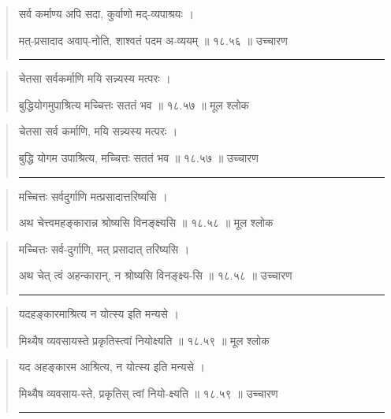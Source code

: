 \begin{quotation}

सर्व कर्माण्य अपि सदा, कुर्वाणो मद्-व्यपाश्रयः ।  

मत्-प्रसादाद अवाप्-नोति, शाश्वतं पदम अ-व्ययम्‌  ॥ १८.५६ ॥  उच्चारण

\noindent\rule{16cm}{0.4pt} 
\end{quotation}


\begin{quotation}

चेतसा सर्वकर्माणि मयि सन्न्यस्य मत्परः ।  

बुद्धियोगमुपाश्रित्य मच्चित्तः सततं भव  ॥ १८.५७ ॥  मूल श्लोक
\end{quotation}

\begin{quotation}

चेतसा सर्व कर्माणि, मयि सन्न्यस्य मत्परः ।  

बुद्धि योगम उपाश्रित्य, मच्चित्तः सततं भव  ॥ १८.५७ ॥  उच्चारण

\noindent\rule{16cm}{0.4pt} 
\end{quotation}


\begin{quotation}

मच्चित्तः सर्वदुर्गाणि मत्प्रसादात्तरिष्यसि ।  

अथ चेत्त्वमहङ्कारान्न श्रोष्यसि विनङ्क्ष्यसि  ॥ १८.५८ ॥  मूल श्लोक
\end{quotation}

\begin{quotation}

मच्चित्तः सर्व-दुर्गाणि, मत् प्रसादात् तरिष्यसि ।  

अथ चेत् त्वं अहन्कारान्, न श्रोष्यसि विनङ्क्ष्य-सि  ॥ १८.५८ ॥  उच्चारण

\noindent\rule{16cm}{0.4pt} 
\end{quotation}


\begin{quotation}

यदहङ्‍कारमाश्रित्य न योत्स्य इति मन्यसे  ।  

मिथ्यैष व्यवसायस्ते प्रकृतिस्त्वां नियोक्ष्यति  ॥ १८.५९ ॥  मूल श्लोक
\end{quotation}

\begin{quotation}
यद अहङ्‍कारम आश्रित्य, न योत्स्य इति मन्यसे  ।  

मिथ्यैष व्यवसाय-स्ते, प्रकृतिस् त्वां नियो-क्ष्यति  ॥ १८.५९ ॥  उच्चारण

\noindent\rule{16cm}{0.4pt} 
\end{quotation}


